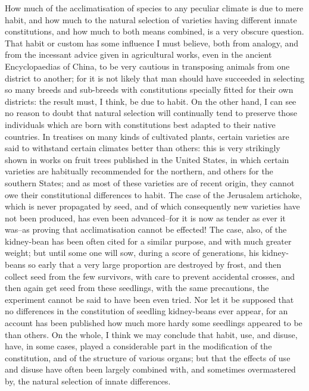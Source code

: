 How much of the acclimatisation of species to any peculiar climate is due to mere habit, and how much to the natural selection of varieties having different innate constitutions, and how much to both means combined, is a very obscure question. That habit or custom has some influence I must believe, both from analogy, and from the incessant advice given in agricultural works, even in the ancient Encyclopaedias of China, to be very cautious in transposing animals from one district to another; for it is not likely that man should have succeeded in selecting so many breeds and sub-breeds with constitutions specially fitted for their own districts: the result must, I think, be due to habit. On the other hand, I can see no reason to doubt that natural selection will continually tend to preserve those individuals which are born with constitutions best adapted to their native countries. In treatises on many kinds of cultivated plants, certain varieties are said to withstand certain climates better than others: this is very strikingly shown in works on fruit trees published in the United States, in which certain varieties are habitually recommended for the northern, and others for the southern States; and as most of these varieties are of recent origin, they cannot owe their constitutional differences to habit. The case of the Jerusalem artichoke, which is never propagated by seed, and of which consequently new varieties have not been produced, has even been advanced--for it is now as tender as ever it was--as proving that acclimatisation cannot be effected! The case, also, of the kidney-bean has been often cited for a similar purpose, and with much greater weight; but until some one will sow, during a score of generations, his kidney-beans so early that a very large proportion are destroyed by frost, and then collect seed from the few survivors, with care to prevent accidental crosses, and then again get seed from these seedlings, with the same precautions, the experiment cannot be said to have been even tried. Nor let it be supposed that no differences in the constitution of seedling kidney-beans ever appear, for an account has been published how much more hardy some seedlings appeared to be than others.
On the whole, I think we may conclude that habit, use, and disuse, have, in some cases, played a considerable part in the modification of the constitution, and of the structure of various organs; but that the effects of use and disuse have often been largely combined with, and sometimes overmastered by, the natural selection of innate differences.

